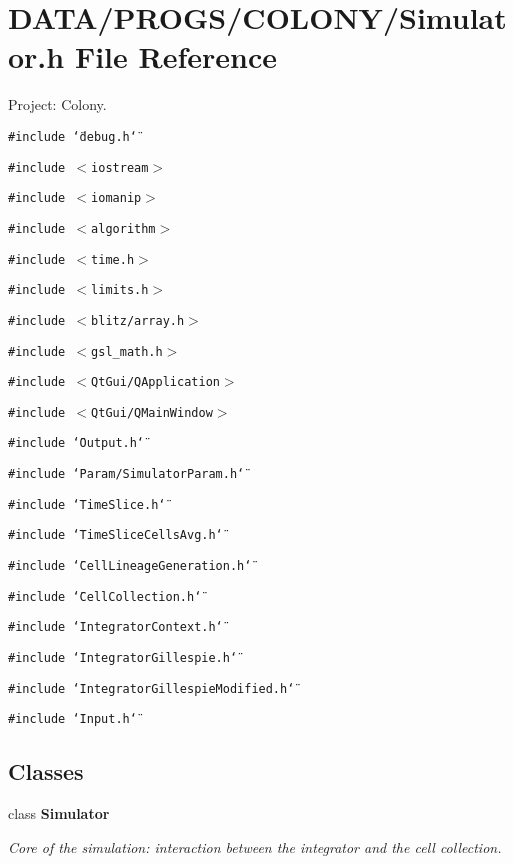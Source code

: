 \section{DATA/PROGS/COLONY/Simulator.h File Reference}
\label{Simulator_8h}
Project: Colony. 

{\tt \#include \char`\"{}debug.h\char`\"{}}\par
{\tt \#include $<$iostream$>$}\par
{\tt \#include $<$iomanip$>$}\par
{\tt \#include $<$algorithm$>$}\par
{\tt \#include $<$time.h$>$}\par
{\tt \#include $<$limits.h$>$}\par
{\tt \#include $<$blitz/array.h$>$}\par
{\tt \#include $<$gsl\_\-math.h$>$}\par
{\tt \#include $<$QtGui/QApplication$>$}\par
{\tt \#include $<$QtGui/QMainWindow$>$}\par
{\tt \#include \char`\"{}Output.h\char`\"{}}\par
{\tt \#include \char`\"{}Param/SimulatorParam.h\char`\"{}}\par
{\tt \#include \char`\"{}TimeSlice.h\char`\"{}}\par
{\tt \#include \char`\"{}TimeSliceCellsAvg.h\char`\"{}}\par
{\tt \#include \char`\"{}CellLineageGeneration.h\char`\"{}}\par
{\tt \#include \char`\"{}CellCollection.h\char`\"{}}\par
{\tt \#include \char`\"{}IntegratorContext.h\char`\"{}}\par
{\tt \#include \char`\"{}IntegratorGillespie.h\char`\"{}}\par
{\tt \#include \char`\"{}IntegratorGillespieModified.h\char`\"{}}\par
{\tt \#include \char`\"{}Input.h\char`\"{}}\par
\subsection*{Classes}
\begin{CompactItemize}
\item 
class {\bf Simulator}
\begin{CompactList}\small\item\em Core of the simulation: interaction between the integrator and the cell collection. \item\end{CompactList}\end{CompactItemize}


